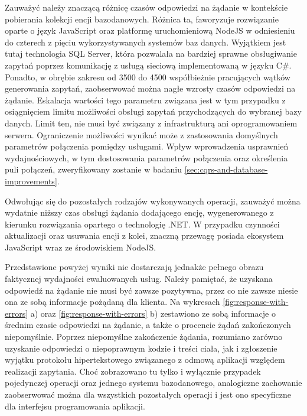 Zauważyć należy znaczącą różnicę czasów odpowiedzi na żądanie w kontekście pobierania kolekcji encji bazodanowych. Różnica ta, faworyzuje rozwiązanie oparte o język JavaScript oraz platformę uruchomieniową NodeJS w odniesieniu do czterech z pięciu wykorzystywanych systemów baz danych. Wyjątkiem jest tutaj technologia SQL Server, która pozwalała na bardziej sprawne obsługiwanie zapytań poprzez komunikację z usługą sieciową implementowaną w języku C\#. Ponadto, w obrębie zakresu od 3500 do 4500 współbieżnie pracujących wątków generowania zapytań, zaobserwować można nagłe wzrosty czasów odpowiedzi na żądanie. Eskalacja wartości tego parametru związana jest w tym przypadku z osiągnięciem limitu możliwości obsługi zapytań przychodzących do wybranej bazy danych. Limit ten, nie musi być związany z infrastrukturą ani oprogramowaniem serwera. Ograniczenie możliwości wynikać może z zastosowania domyślnych parametrów połączenia pomiędzy usługami. Wpływ wprowadzenia usprawnień wydajnościowych, w tym dostosowania parametrów połączenia oraz określenia puli połączeń, zweryfikowany zostanie w badaniu \ref{sec:cqrs-and-database-improvements}.  

Odwołując się do pozostałych rodzajów wykonywanych operacji, zauważyć można wydatnie niższy czas obsługi żądania dodającego encję, wygenerowanego z kierunku rozwiązania opartego o technologię .NET. W przypadku czynności aktualizacji oraz usuwania encji z kolei, znaczną przewagę posiada ekosystem JavaScript wraz ze środowiskiem NodeJS.

Przedstawione powyżej wyniki nie dostarczają jednakże pełnego obrazu faktycznej wydajności ewaluowanych usług. Należy pamiętać, że uzyskana odpowiedź na żądanie nie musi być zawsze pozytywna, przez co nie zawsze niesie ona ze sobą informacje pożądaną dla klienta. Na wykresach \ref{fig:response-with-errors} a) oraz \ref{fig:response-with-errors} b) zestawiono ze sobą informacje o średnim czasie odpowiedzi na żądanie, a także o procencie żądań zakończonych niepomyślnie. Poprzez niepomyślne zakończenie żądania, rozumiano zarówno uzyskanie odpowiedzi o niepoprawnym kodzie i treści ciała, jak i zgłoszenie wyjątku protokołu hipertekstowego związanego z odmową aplikacji względem realizacji zapytania. Choć zobrazowano tu tylko i wyłącznie przypadek pojedynczej operacji oraz jednego systemu bazodanowego, analogiczne zachowanie zaobserwować można dla wszystkich pozostałych operacji i jest ono specyficzne dla interfejsu programowania aplikacji. 

